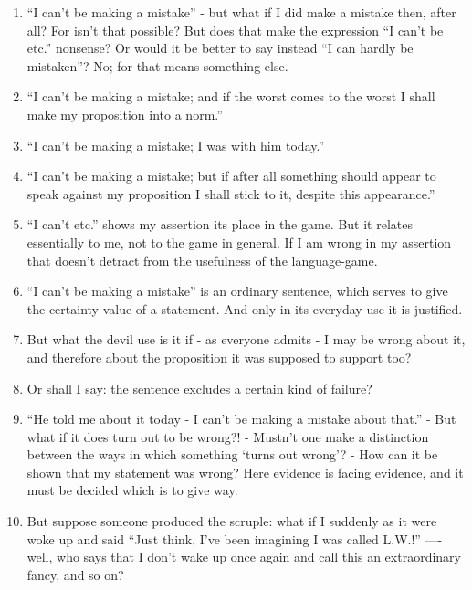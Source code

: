 \documentclass{book}
\begin{document}
\begin{enumerate}
\item
``I can't be making a mistake'' - but what if I did make a mistake then, after
all? For isn't that possible? But does that make the expression ``I can't be
etc.'' nonsense? Or would it be better to say instead ``I can hardly be
mistaken''? No; for that means something else.

\item
``I can't be making a mistake; and if the worst comes to the worst I shall make
my proposition into a norm.''

\item
``I can't be making a mistake; I was with him today.''

\item
``I can't be making a mistake; but if after all something should appear to
speak against my proposition I shall stick to it, despite this appearance.''

\item
``I can't etc.'' shows my assertion its place in the game. But it relates
essentially to me, not to the game in general.  If I am wrong in my assertion
that doesn't detract from the usefulness of the language-game.

\item
``I can't be making a mistake'' is an ordinary sentence, which serves to give
the certainty-value of a statement. And only in its everyday use it is
justified.

\item
But what the devil use is it if - as everyone admits - I may be wrong about it,
and therefore about the proposition it was supposed to support too?

\item
Or shall I say: the sentence excludes a certain kind of failure?

\item
``He told me about it today - I can't be making a mistake about that.'' - But
what if it does turn out to be wrong?! - Mustn't one make a distinction between
the ways in which something `turns out wrong'? - How can it be shown that my
statement was wrong? Here evidence is facing evidence, and it must be decided
which is to give way.

\item
But suppose someone produced the scruple: what if I suddenly as it were woke up
and said ``Just think, I've been imagining I was called L.W.!'' ---- well, who
says that I don't wake up once again and call this an extraordinary fancy, and
so on?


\end{enumerate}
\end{document}
